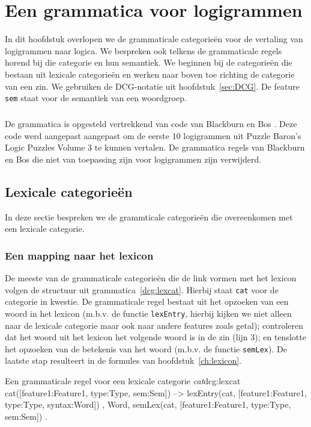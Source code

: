 \chapter{Een grammatica voor logigrammen}
\label{ch:grammatica}

In dit hoofdstuk overlopen we de grammaticale categorieën voor de vertaling van logigrammen naar logica. We bespreken ook telkens de grammaticale regels horend bij die categorie en hun semantiek. We beginnen bij de categorieën die bestaan uit lexicale categorieën en werken naar boven toe richting de categorie van een zin. We gebruiken de DCG-notatie uit hoofdstuk~\ref{sec:DCG}. De feature \texttt{sem} staat voor de semantiek van een woordgroep.

\paragraph{}De grammatica is opgesteld vertrekkend van code van Blackburn en Bos \cite{Blackburn2006}. Deze code werd aangepast aangepast om de eerste 10 logigrammen uit Puzzle Baron's Logic Puzzles Volume 3 \cite{logigrammen} te kunnen vertalen. De grammatica regels van Blackburn en Bos die niet van toepassing zijn voor logigrammen zijn verwijderd.

\section{Lexicale categorieën}
In deze sectie bespreken we de grammticale categorieën die overeenkomen met een lexicale categorie.

\subsection{Een mapping naar het lexicon}
\label{sec:lexgram}
De meeste van de grammaticale categorieën die de link vormen met het lexicon volgen de structuur uit grammatica~\ref{dcg:lexcat}. Hierbij staat \texttt{cat} voor de categorie in kwestie. De grammaticale regel bestaat uit het opzoeken van een woord in het lexicon (m.b.v. de functie \texttt{lexEntry}, hierbij kijken we niet alleen naar de lexicale categorie maar ook naar andere features zoals getal); controleren dat het woord uit het lexicon het volgende woord is in de zin (lijn 3); en tenslotte het opzoeken van de betekenis van het woord (m.b.v. de functie \texttt{semLex}). De laatste stap resulteert in de formules van hoofdstuk~\ref{ch:lexicon}.

\begin{dcg}{Een grammaticale regel voor een lexicale categorie \textit{cat}}{dcg:lexcat}
cat([feature1:Feature1, type:Type, sem:Sem]) -->
  { lexEntry(cat, [feature1:Feature1, type:Type, syntax:Word]) },
  Word,
  { semLex(cat, [feature1:Feature1, type:Type, sem:Sem]) }.
\end{dcg}

